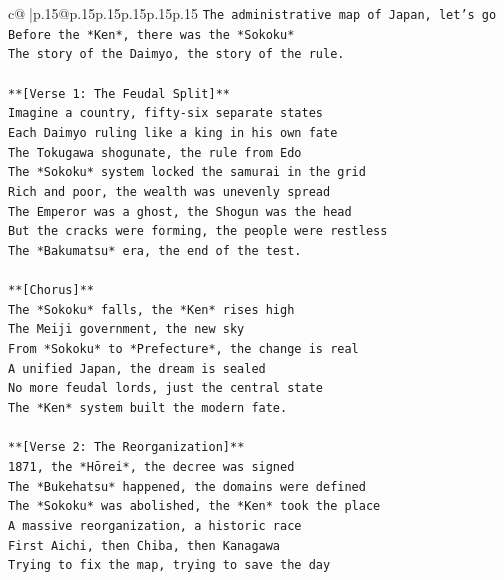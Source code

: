 \documentclass{article}
\begin{document}
{\begin{supertabular}{c@{$\;$}|p{.15\linewidth}@{}p{.15\linewidth}p{.15\linewidth}p{.15\linewidth}p{.15\linewidth}p{.15\linewidth}}
{{{\texttt{The administrative map of Japan, let's go} \\
\texttt{Before the *Ken*, there was the *Sokoku*} \\
\texttt{The story of the Daimyo, the story of the rule.} \\
\\ 
\texttt{**{[}Verse 1: The Feudal Split{]}**} \\
\texttt{Imagine a country, fifty{-}six separate states} \\
\texttt{Each Daimyo ruling like a king in his own fate} \\
\texttt{The Tokugawa shogunate, the rule from Edo} \\
\texttt{The *Sokoku* system locked the samurai in the grid} \\
\texttt{Rich and poor, the wealth was unevenly spread} \\
\texttt{The Emperor was a ghost, the Shogun was the head} \\
\texttt{But the cracks were forming, the people were restless} \\
\texttt{The *Bakumatsu* era, the end of the test.} \\
\\ 
\texttt{**{[}Chorus{]}**} \\
\texttt{The *Sokoku* falls, the *Ken* rises high} \\
\texttt{The Meiji government, the new sky} \\
\texttt{From *Sokoku* to *Prefecture*, the change is real} \\
\texttt{A unified Japan, the dream is sealed} \\
\texttt{No more feudal lords, just the central state} \\
\texttt{The *Ken* system built the modern fate.} \\
\\ 
\texttt{**{[}Verse 2: The Reorganization{]}**} \\
\texttt{1871, the *Hōrei*, the decree was signed} \\
\texttt{The *Bukehatsu* happened, the domains were defined} \\
\texttt{The *Sokoku* was abolished, the *Ken* took the place} \\
\texttt{A massive reorganization, a historic race} \\
\texttt{First Aichi, then Chiba, then Kanagawa} \\
\texttt{Trying to fix the map, trying to save the day} \\
}}}
\end{supertabular}}
\end{document}
